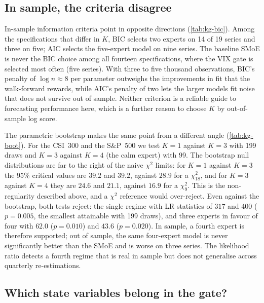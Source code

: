 

\subsection{In sample, the criteria disagree}

In-sample information criteria point in opposite directions (\cref{tab:kg-bic}). Among the
specifications that differ in $K$, BIC selects two experts on 14 of 19 series and three on five; AIC
selects the five-expert model on nine series. The baseline SMoE is never the BIC choice among all fourteen
specifications, where the VIX gate is selected most often (five series). With three to five thousand
observations, BIC's penalty of $\log n\approx8$ per parameter outweighs the improvements in fit that
the walk-forward rewards, while AIC's penalty of two lets the larger models fit noise that does not
survive out of sample. Neither criterion is a reliable guide to forecasting performance here, which is
a further reason to choose $K$ by out-of-sample log score.

The parametric bootstrap makes the same point from a different angle (\cref{tab:kg-boot}). For the
CSI~300 and the S\&P~500 we test $K=1$ against $K=3$ with 199 draws and $K=3$ against $K=4$ (the
calm expert) with 99. The bootstrap null distributions are far to the right of the naive $\chi^2$
limits: for $K=1$ against $K=3$ the 95\% critical values are $39.2$ and $39.2$, against $28.9$ for a
$\chi^2_{18}$, and for $K=3$ against $K=4$ they are $24.6$ and $21.1$, against $16.9$ for a
$\chi^2_9$. This is the non-regularity described above, and a $\chi^2$ reference would over-reject.
Even against the bootstrap, both tests reject: the single regime with LR statistics of $317$ and $400$
($p=0.005$, the smallest attainable with 199 draws), and three experts in favour of four with
$62.0$ ($p=0.010$) and $43.6$ ($p=0.020$). In sample, a fourth expert is therefore supported;
out of sample, the same four-expert model is never significantly better than the SMoE and is worse
on three series. The likelihood ratio detects a fourth regime that is real in sample but does not
generalise across quarterly re-estimations.





\subsection{Which state variables belong in the gate?}

